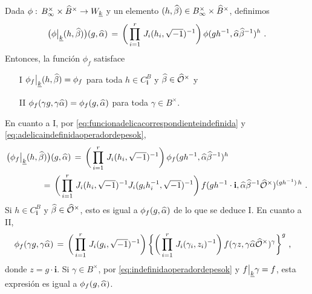 Dada $\phi:\,{B}_{\infty}^{\times}\times\widehat{B}^{\times}\rightarrow W_{\underline{k}}$ y un elemento
$(h,\widehat{\beta})\in{B}_{\infty}^{\times}\times\widehat{B}^{\times}$, definimos
\begin{equation}
	\label{eq:adelicaindefinidaoperadordepesok}
	\big(\phi\big|_{\underline{k}}{(h,\widehat{\beta})}\big)
		(g,\widehat{\alpha}) \,=\,
		\bigg(\prod_{i=1}^{r}\,J_{i}(h_{i},\sqrt{-1})^{-1}\bigg)\,
		\phi(gh^{-1},\widehat{\alpha}\widehat{\beta}^{-1})^{h}
	\text{ .}
\end{equation}
%
Entonces, la funci\'{o}n $\phi_{f}$ satisface
\begin{itemize}
	\item[I]
		\begin{math}
			\phi_{f}\big|_{\underline{k}}{(h,\widehat{\beta})}=
				\phi_{f}
		\end{math}
		para toda $h\in  C^{B}_{\mathbf{i}}$ y
		$\widehat{\beta}\in\widehat{\mathcal{O}}^{\times}$ y
	\item[II]
		\begin{math}
			\phi_{f}(\gamma g,\gamma\widehat{\alpha})=
				\phi_{f}(g,\widehat{\alpha})
		\end{math}
		para toda $\gamma\in B^{\times}$.
\end{itemize}
%
En cuanto a I, por \eqref{eq:funcionadelicacorrespondienteindefinida} y
\eqref{eq:adelicaindefinidaoperadordepesok},
\begin{align*}
	& \big(\phi_{f}\big|_{\underline{k}}{(h,\widehat{\beta})}\big)
		(g,\widehat{\alpha}) \,=\,
		\bigg(\prod_{i=1}^{r}\,J_{i}(h_{i},\sqrt{-1})^{-1}\bigg)\,
			\phi_{f}(gh^{-1},\widehat{\alpha}\widehat{\beta}^{-1})^{h} \\
	& \qquad\qquad\,=\,
		\bigg(\prod_{i=1}^{r}\,J_{i}(h_{i},\sqrt{-1})^{-1}
		J_{i}(g_{i}h_{i}^{-1},\sqrt{-1})^{-1}\bigg)\,
		f(gh^{-1}\cdot\mathbf{i},
		\widehat{\alpha}\widehat{\beta}^{-1}\widehat{\mathcal{O}}^{\times})^{(gh^{-1})\,h}
	\text{ .}
\end{align*}
%
Si $h\in C^{B}_{\mathbf{i}}$ y $\widehat{\beta}\in\widehat{\mathcal{O}}^{\times}$, esto es
igual a $\phi_{f}(g,\widehat{\alpha})$ de lo que se deduce I. En cuanto a II,
\begin{align*}
	\phi_{f}(\gamma g,\gamma\widehat{\alpha})
	& \,=\,\bigg(\prod_{i=1}^{r}\,J_{i}(g_{i},\sqrt{-1})^{-1}\bigg)\,
		\bigg\{\bigg(\prod_{i=1}^{r}\,J_{i}(\gamma_{i},z_{i})^{-1}
			\bigg)\,f(\gamma z,\gamma\widehat{\alpha}\widehat{\mathcal{O}}^{\times}
				)^{\gamma}\bigg\}^{g}
	\text{ ,}
\end{align*}
%
donde $z=g\cdot\mathbf{i}$. Si $\gamma\in B^{\times}$, por
\eqref{eq:indefinidaoperadordepesok} y
$f\big|_{\underline{k}}{\gamma}=f$, esta expresi\'{o}n es igual a
$\phi_{f}(g,\widehat{\alpha})$.

